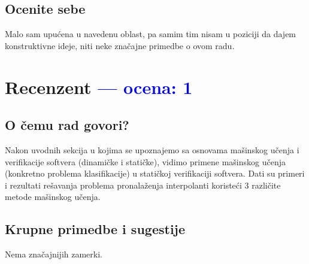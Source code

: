 \documentclass[a4paper]{report}
\newcommand{\odgovor}[1]{\textcolor{blue}{#1}}
\begin{document}
\section{Ocenite sebe}
Malo sam upućena u navedenu oblast, pa samim tim nisam u poziciji da dajem konstruktivne ideje, niti neke značajne primedbe o ovom radu.

\chapter{Recenzent \odgovor{--- ocena: 1} }


\section{O čemu rad govori?}
Nakon uvodnih sekcija u kojima se upoznajemo sa osnovama mašinskog učenja i verifikacije softvera (dinamičke i statičke), vidimo primene mašinskog učenja (konkretno problema klasifikacije) u statičkoj verifikaciji softvera. Dati su primeri i rezultati rešavanja problema pronalaženja interpolanti koristeći 3 različite metode mašinskog učenja.

\section{Krupne primedbe i sugestije}
Nema značajnijih zamerki.
\end{document}
